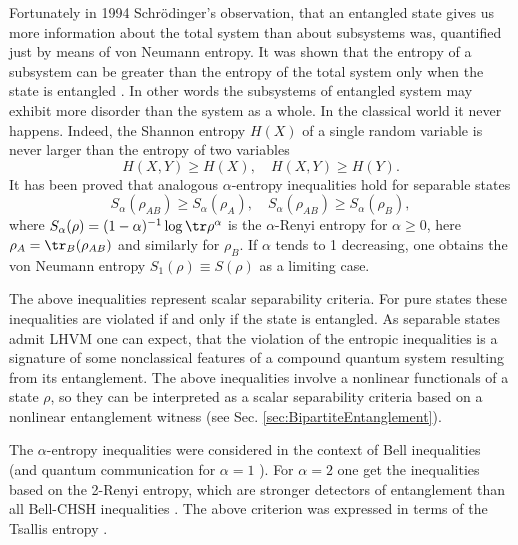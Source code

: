 \documentclass[rmp,12pt,preprint]{revtex4-2}
\begin{document}
Fortunately in 1994 Schr{\"o}dinger's observation, that an entangled
state gives us more information about the total system than about
subsystems was, quantified just by means of von Neumann entropy. It
was shown that the entropy of a subsystem can be greater than the
entropy of the total system only when the state is entangled \cite
{RPH1994}. In other words the subsystems of entangled system may
exhibit more disorder than the system as a whole. In the classical
world it never happens. Indeed, the Shannon entropy $H(X)$ of a single
random variable is never larger than the entropy of two variables
\begin{equation}
  H(X,Y)\geq H(X), \quad  H(X,Y)\geq H(Y). \label{H}
\end{equation}
It has been proved \cite {MRH-PRA96,alpha,VollbrechtW,TerhalReview} that analogous
$\alpha$-entropy inequalities hold for separable states
\begin{equation}
S_\alpha(\rho_{AB}) \geq S_\alpha(\rho_A),  \quad S_\alpha(\rho_{AB}) \geq
S_\alpha(\rho_B), \label{ent}
\end{equation}
where $S_\alpha(\rho)= (1-\alpha)^{-1} \log {\tr} \rho^\alpha$ is the
$\alpha$-Renyi entropy for $\alpha \ge 0$, here
$\rho_A={\tr}_B(\rho_{AB})$ and similarly for $\rho_B$. If $\alpha$
tends to 1 decreasing, one obtains the von Neumann entropy
$S_1(\rho)\equiv S(\rho)$ as a limiting case.

The above inequalities represent scalar  separability criteria.
For pure states these inequalities are violated if and only if
the state is entangled. As separable states admit LHVM one can
expect, that the violation of the entropic inequalities is a
signature of some nonclassical features of a compound quantum system
resulting from its entanglement. The above inequalities involve a
nonlinear functionals of a state $\rho$, so they can be interpreted
as a scalar separability criteria based on a nonlinear entanglement
witness (see Sec. \ref{sec:BipartiteEntanglement}).

The $\alpha$-entropy inequalities were considered in the context of
Bell inequalities \cite {MRH-PRA96} (and quantum communication for
$\alpha =1$ \cite{cerfadami}). For $\alpha=2$ one get the inequalities
based on the 2-Renyi entropy, which are stronger detectors of
entanglement than all Bell-CHSH inequalities
\cite{alpha,habil,Santos}. The above criterion was expressed in terms
of the Tsallis entropy \cite {Abe,Tsallis2,Barranco}.
\end{document}

